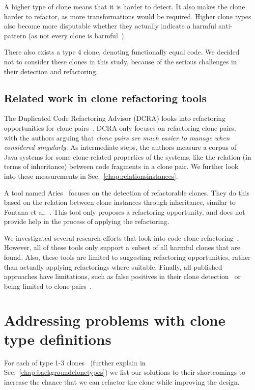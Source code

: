 \documentclass[a4paper]{article}
\begin{document}
A higher type of clone means that it is harder to detect. It also makes the clone harder to refactor, as more transformations would be required. Higher clone types also become more disputable whether they actually indicate a harmful anti-pattern (as not every clone is harmful~\cite{jarzabek2010clones, kapser2008cloning}).

There also exists a type 4 clone, denoting functionally equal code. We decided not to consider these clones in this study, because of the serious challenges in their detection and refactoring.

\subsection{Related work in clone refactoring tools}
The Duplicated Code Refactoring Advisor (DCRA) looks into refactoring opportunities for clone pairs~\cite{fontana2012duplicated, fontana2015duplicated}. DCRA only focuses on refactoring clone pairs, with the authors arguing that \textit{clone pairs are much easier to manage when considered singularly.} As intermediate steps, the authors measure a corpus of Java systems for some clone-related properties of the systems, like the relation (in terms of inheritance) between code fragments in a clone pair. We further look into these measurements in Sec.~\ref{chap:relationsinstances}.

A tool named Aries~\cite{higo2004aries, higo2008metric} focuses on the detection of refactorable clones. They do this based on the relation between clone instances through inheritance, similar to Fontana et al.~\cite{fontana2012duplicated}. This tool only proposes a refactoring opportunity, and does not provide help in the process of applying the refactoring.

We investigated several research efforts that look into code clone refactoring~\cite{alwaqfi2017refactoring, chen2018clone, koni2001scenario}. However, all of these tools only support a subset of all harmful clones that are found. Also, these tools are limited to suggesting refactoring opportunities, rather than actually applying refactorings where suitable. Finally, all published approaches have limitations, such as false positives in their clone detection~\cite{chen2018clone} or being limited to clone pairs~\cite{higo2008metric}.

\section{Addressing problems with clone type definitions}\label{chap:clonetypes}
For each of type 1-3 clones~\cite{roy2007survey} (further explain in Sec.~\ref{chap:backgroundclonetypes}) we list our solutions to their shortcomings to increase the chance that we can refactor the clone while improving the design.
\end{document}
